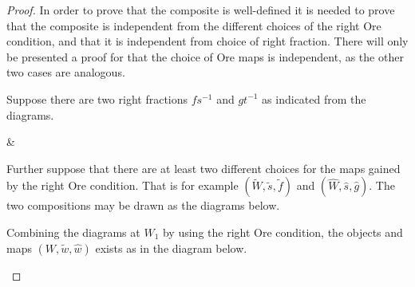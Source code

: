     \begin{proof}
        In order to prove that the composite is well-defined it is  needed to prove that the composite is independent from the different choices of the right Ore condition, and that it is independent from choice of right fraction. There will only be presented a proof for that the choice of Ore maps is independent, as the other two cases are analogous.

        Suppose there are two right fractions $fs^{-1}$ and $gt^{-1}$ as indicated from the diagrams.
        \begin{center}
            \&
        \end{center}
        Further suppose that there are at least two different choices for the maps gained by the right Ore condition. That is for example $(\widetilde{W},\widetilde{s},\widetilde{f})$ and $(\widehat{W},\widehat{s}, \widehat{g})$. The two compositions may be drawn as the diagrams below.
        \begin{center}
        \end{center}
        Combining the diagrams at $W_1$ by using the right Ore condition, the objects and maps  $(W, \widetilde{w}, \widehat{w})$ exists as in the diagram below. 
        \begin{center}
\end{center}
\end{proof}
